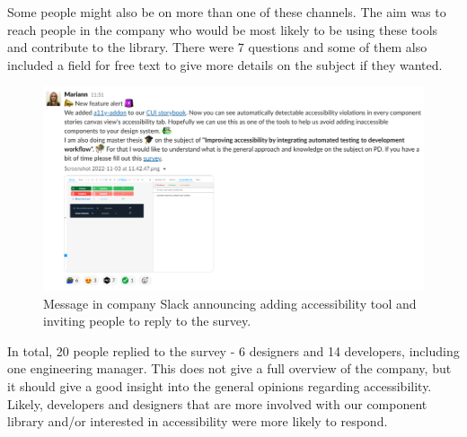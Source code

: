 \documentclass{master_thesis}
\begin{document}
Some people might also be on more than one of these channels. The aim was to reach people in the company who would be most likely to be using these tools and contribute to the library. There were 7 questions and some of them also included a field for free text to give more details on the subject if they wanted.

\begin{figure}[H]
	\centering
	\includegraphics[width=\textwidth]{img/survey.png}
	\caption{Message in company Slack announcing adding accessibility tool and inviting people to reply to the survey.}
	\label{fig:slack-message}
\end{figure}

In total, 20 people replied to the survey - 6 designers and 14 developers, including one engineering manager. This does not give a full overview of the company, but it should give a good insight into the general opinions regarding accessibility. Likely, developers and designers that are more involved with our component library and/or interested in accessibility were more likely to respond.
\end{document}
